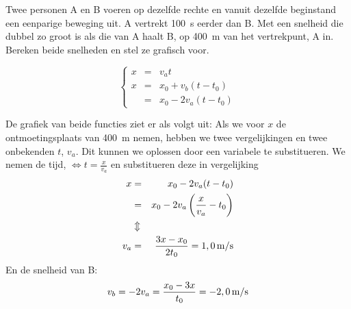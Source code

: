 \documentclass{ximera}
\begin{document}
\begin{exercise}
    Twee personen A en B voeren op dezelfde rechte en vanuit dezelfde beginstand een eenparige beweging uit. A vertrekt \SI{100}{s} eerder dan B. Met een snelheid die dubbel zo groot is als die van A haalt B, op \SI{400}{m} van het vertrekpunt, A in. Bereken beide snelheden en stel ze grafisch voor.
    \begin{oplossing}


    \[
    \left\{
        \begin{array}{rcl}
            x&=&v_at\\
            x&=&x_0+v_b(t-t_0)\\
            &=& x_0-2v_a(t-t_0)
        \end{array}
    \right.
    \]

    De grafiek van beide functies ziet er als volgt uit:
    \newline
    Als we voor $x$ de ontmoetingsplaats van \SI{400}{m} nemen, hebben we twee vergelijkingen en twee onbekenden $t$, $v_a$. Dit kunnen we oplossen door een variabele te substitueren. We nemen de tijd, $\Leftrightarrow t=\frac{x}{v_a}$ en substitueren deze in vergelijking %
    \begin{eqnarray*}
    x&=&x_0-2v_a(t-t_0)\\
    &=&x_0-2v_a\left(\frac{x}{v_a}-t_0\right)\\
    &\Updownarrow&\\
    v_a&=&\frac{3x-x_0}{2t_0}=1,0\rm\,m/s
    \end{eqnarray*}
    En de snelheid van B:
    \begin{equation}
    v_b=-2v_a=\frac{x_0-3x}{t_0}=-2,0\rm\,m/s
    \end{equation} 
    \end{oplossing}
\end{exercise}
\end{document}
